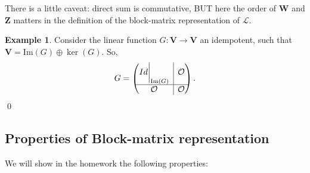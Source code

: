\documentclass{article}
\theoremstyle{definition}
\newtheorem{exmp}{Example}[section]
\newcommand{\V}{\mathbf{V}}
\newcommand{\W}{\mathbf{W}}
\newcommand{\Z}{\mathbf{Z}}
\newcommand{\lag}{\mathcal{L}}
\newcommand{\ima}{\text{Im}}
\newcommand{\rvline}{\hspace*{-\arraycolsep}\vline\hspace*{-\arraycolsep}}
\begin{document}
There is a little caveat: direct sum is commutative, BUT here the order of $\W$ and $\Z$ matters in the definition of the block-matrix representation of $\lag$. 

\begin{exmp}
	Consider the linear function $G : \V \to \V$ an idempotent, such that $\V = \ima(G) \oplus \ker(G)$. So,
	\begin{align*}
	G = \begin{pmatrix}
	Id \bigg\vert_{\ima(G)} & \rvline & \mathcal{O}\\
	\hline
	\mathcal{O} & \rvline & \mathcal{O}
	\end{pmatrix}.
	\end{align*}\qed
\end{exmp}







\subsection{Properties of Block-matrix representation}
We will show in the homework the following properties:
\end{document}
